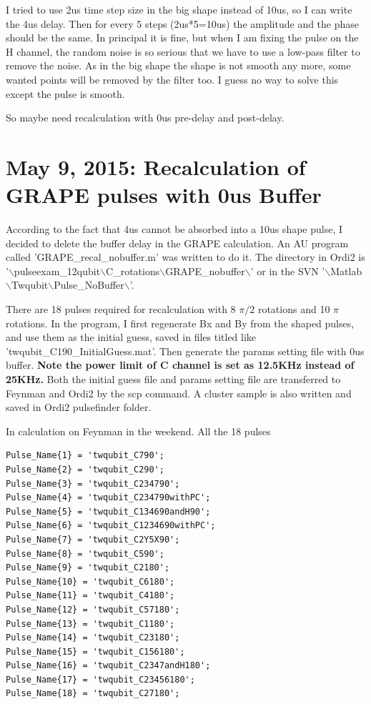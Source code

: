 \documentclass[prl,onecolumn]{revtex4-1}
\newcommand{\dir}{$\backslash$}
\begin{document}
I tried to use 2us time step size in the big shape instead of 10us, so I can write the 4us delay. Then for every 5 steps (2us*5=10us) the amplitude and the phase should be the same. In principal it is fine, but when I am fixing the pulse on the H channel, the random noise is so serious that we have to use a low-pass filter to remove the noise. As in the big shape the shape is not smooth any more, some wanted points will be removed by the filter too. I guess no way to solve this except the pulse is smooth.

So maybe need recalculation with 0us pre-delay and post-delay.

\newpage
\section{May 9, 2015: Recalculation of GRAPE pulses with 0us Buffer}

According to the fact that 4us cannot be absorbed into a 10us shape pulse, I decided to delete the buffer delay in the GRAPE calculation. An AU program called 'GRAPE\_recal\_nobuffer.m' was written to do it. The directory in Ordi2 is '\dir pulseexam\_12qubit\dir C\_rotations\dir GRAPE\_nobuffer\dir' or in the SVN '\dir Matlab\dir Twqubit\dir Pulse\_NoBuffer\dir'.

There are 18 pulses required for recalculation with 8 $\pi/2$ rotations and 10 $\pi$ rotations. In the program, I first regenerate Bx and By from the shaped pulses, and use them as the initial guess, saved in files titled like 'twqubit\_C190\_InitialGuess.mat'. Then generate the params setting file with 0us buffer. \textbf{Note the power limit of C channel is set as 12.5KHz instead of 25KHz. }Both the initial guess file and params setting file are transferred to Feynman and Ordi2 by the scp command. A cluster sample is also written and saved in Ordi2 pulsefinder folder.

In calculation on Feynman in the weekend. All the 18 pulses
\begin{lstlisting}
Pulse_Name{1} = 'twqubit_C790';
Pulse_Name{2} = 'twqubit_C290';
Pulse_Name{3} = 'twqubit_C234790';
Pulse_Name{4} = 'twqubit_C234790withPC';
Pulse_Name{5} = 'twqubit_C134690andH90';
Pulse_Name{6} = 'twqubit_C1234690withPC';
Pulse_Name{7} = 'twqubit_C2Y5X90';
Pulse_Name{8} = 'twqubit_C590';
Pulse_Name{9} = 'twqubit_C2180';
Pulse_Name{10} = 'twqubit_C6180';
Pulse_Name{11} = 'twqubit_C4180';
Pulse_Name{12} = 'twqubit_C57180';
Pulse_Name{13} = 'twqubit_C1180';
Pulse_Name{14} = 'twqubit_C23180';
Pulse_Name{15} = 'twqubit_C156180';
Pulse_Name{16} = 'twqubit_C2347andH180';
Pulse_Name{17} = 'twqubit_C23456180';
Pulse_Name{18} = 'twqubit_C27180';
\end{lstlisting}
\end{document}
